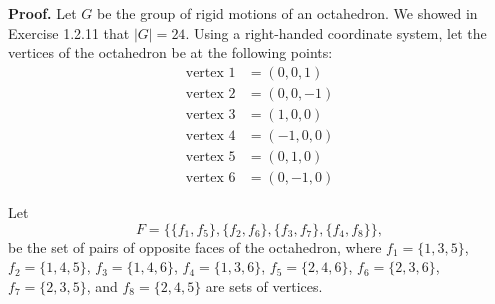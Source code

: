 \begin{enumerate}
      \textbf{Proof.} Let $G$ be the group of rigid motions of an octahedron. We 
      showed in Exercise 1.2.11 that $|G| = 24$. Using a right-handed coordinate
      system, let the vertices of the octahedron be at the following points:
      \begin{align*}
         \text{vertex 1} &= (0, 0, 1) \\
         \text{vertex 2} &= (0, 0, -1) \\
         \text{vertex 3} &= (1, 0, 0) \\
         \text{vertex 4} &= (-1, 0, 0) \\
         \text{vertex 5} &= (0, 1, 0) \\
         \text{vertex 6} &= (0, -1, 0)
      \end{align*}

      Let
      $$F = \{\{f_1, f_5\}, \{f_2, f_6\}, \{f_3, f_7\}, \{f_4, f_8\}\},$$
      be the set of pairs of opposite faces of the octahedron, where
      $f_1 = \{1, 3, 5\}$, $f_2 = \{1, 4, 5\}$, $f_3 = \{1, 4, 6\}$,
      $f_4 = \{1, 3, 6\}$, $f_5 = \{2, 4, 6\}$, $f_6 = \{2, 3, 6\}$,
      $f_7 = \{2, 3, 5\}$, and $f_8 = \{2, 4, 5\}$ are sets of vertices.


\end{enumerate}
